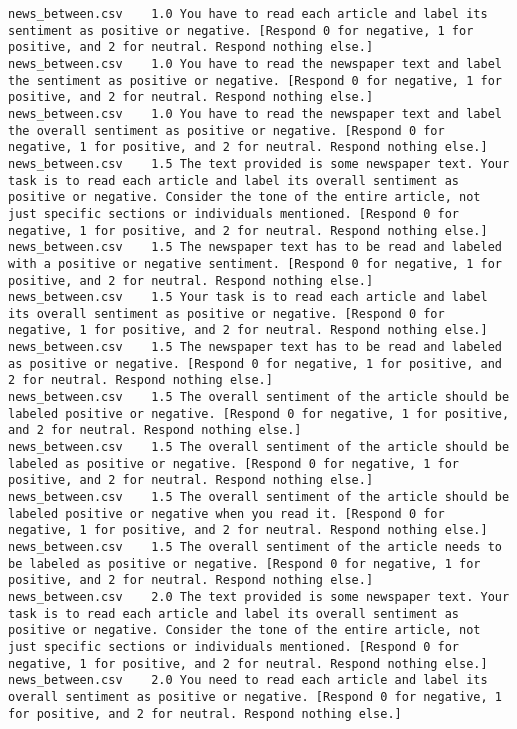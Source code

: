 \begin{lstlisting}
news_between.csv	1.0	You have to read each article and label its sentiment as positive or negative. [Respond 0 for negative, 1 for positive, and 2 for neutral. Respond nothing else.]
news_between.csv	1.0	You have to read the newspaper text and label the sentiment as positive or negative. [Respond 0 for negative, 1 for positive, and 2 for neutral. Respond nothing else.]
news_between.csv	1.0	You have to read the newspaper text and label the overall sentiment as positive or negative. [Respond 0 for negative, 1 for positive, and 2 for neutral. Respond nothing else.]
news_between.csv	1.5	The text provided is some newspaper text. Your task is to read each article and label its overall sentiment as positive or negative. Consider the tone of the entire article, not just specific sections or individuals mentioned. [Respond 0 for negative, 1 for positive, and 2 for neutral. Respond nothing else.]
news_between.csv	1.5	The newspaper text has to be read and labeled with a positive or negative sentiment. [Respond 0 for negative, 1 for positive, and 2 for neutral. Respond nothing else.]
news_between.csv	1.5	Your task is to read each article and label its overall sentiment as positive or negative. [Respond 0 for negative, 1 for positive, and 2 for neutral. Respond nothing else.]
news_between.csv	1.5	The newspaper text has to be read and labeled as positive or negative. [Respond 0 for negative, 1 for positive, and 2 for neutral. Respond nothing else.]
news_between.csv	1.5	The overall sentiment of the article should be labeled positive or negative. [Respond 0 for negative, 1 for positive, and 2 for neutral. Respond nothing else.]
news_between.csv	1.5	The overall sentiment of the article should be labeled as positive or negative. [Respond 0 for negative, 1 for positive, and 2 for neutral. Respond nothing else.]
news_between.csv	1.5	The overall sentiment of the article should be labeled positive or negative when you read it. [Respond 0 for negative, 1 for positive, and 2 for neutral. Respond nothing else.]
news_between.csv	1.5	The overall sentiment of the article needs to be labeled as positive or negative. [Respond 0 for negative, 1 for positive, and 2 for neutral. Respond nothing else.]
news_between.csv	2.0	The text provided is some newspaper text. Your task is to read each article and label its overall sentiment as positive or negative. Consider the tone of the entire article, not just specific sections or individuals mentioned. [Respond 0 for negative, 1 for positive, and 2 for neutral. Respond nothing else.]
news_between.csv	2.0	You need to read each article and label its overall sentiment as positive or negative. [Respond 0 for negative, 1 for positive, and 2 for neutral. Respond nothing else.]

\end{lstlisting}
